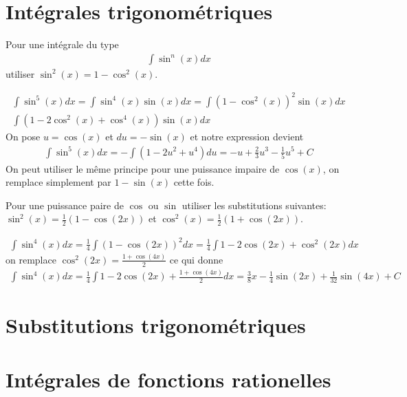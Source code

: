 \section{Intégrales trigonométriques}
Pour une intégrale du type
\begin{eqnarray*}
	\int\sin^n{(x)}dx
\end{eqnarray*}
utiliser $\sin^2{(x)}=1-\cos^2{(x)}$.
\begin{myExample}
	\begin{eqnarray*}
		\int\sin^5{(x)}dx=\int\sin^4{(x)}\sin{(x)}dx=\int\left(1-\cos^2{(x)}\right)^2\sin{(x)}dx
		\\
		\int\left(1-2\cos^2{(x)}+\cos^4{(x)}\right)\sin{(x)}dx
	\end{eqnarray*}
	On pose $u=\cos{(x)}$ et $du=-\sin{(x)}$ et notre expression devient
	\begin{eqnarray*}
		\int\sin^5{(x)}dx=-\int\left(1-2u^2+u^4\right)du=-u+\frac{2}{3}u^3-\frac{1}{5}u^5+C
	\end{eqnarray*}
On peut utiliser le même principe pour une puissance impaire de $\cos{(x)}$, on remplace simplement par $1-\sin{(x)}$ cette fois.
\end{myExample}

Pour une puissance paire de $\cos$ ou $\sin$ utiliser les substitutions suivantes: $\sin^2{(x)}=\frac{1}{2}(1-\cos{(2x)})$ et $\cos^2{(x)}=\frac{1}{2}(1+\cos{(2x)})$.
\begin{myExample}
	\begin{eqnarray*}
		\int\sin^4{(x)}dx=\frac{1}{4}\int(1-\cos{(2x)})^2dx=\frac{1}{4}\int1-2\cos{(2x)}+\cos^2{(2x)}dx
	\end{eqnarray*}
	on remplace $\cos^2{(2x)}=\frac{1+\cos{(4x)}}{2}$ ce qui donne
	\begin{eqnarray*}
		\int\sin^4{(x)}dx=\frac{1}{4}\int1-2\cos{(2x)}+\frac{1+\cos{(4x)}}{2}dx=\frac{3}{8}x-\frac{1}{4}\sin{(2x)}+\frac{1}{32}\sin{(4x)}+C
	\end{eqnarray*}
\end{myExample}

\section{Substitutions trigonométriques}
\section{Intégrales de fonctions rationelles}

